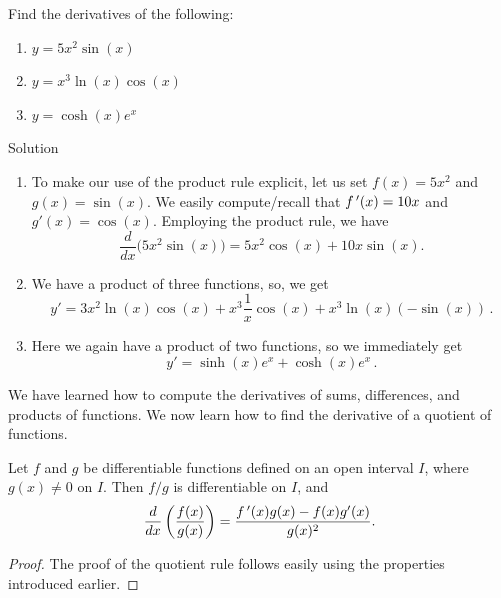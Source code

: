 \fi
\fi


\begin{example}\label{ex_prod1}
Find the derivatives of the following:
\begin{multicols}{3}
\begin{enumerate}
\item $y=5x^2\sin(x)$
\item $y = x^3\ln(x)\cos(x)$
\ifcourse
\ifanalysis \item $y=\cosh(x)e^x$\fi \fi
\end{enumerate}
\end{multicols}

Solution 

\begin{enumerate}
\item To make our use of the product rule explicit, let us set $f(x) = 5x^2$ and $g(x) = \sin (x)$. We easily compute/recall that $f\,'(x) = 10x$ and $g'(x) = \cos (x)$. Employing the product rule, we have 
$$\frac{d}{dx}\Big(5x^2\sin (x)\Big) = 5x^2\cos (x) + 10x\sin (x).$$
\item We have a product of three functions, so, we get
$$
y' = 3x^2\ln(x)\cos(x)  + x^3\frac{1}{x}\cos(x)+ x^3\ln(x)(-\sin(x))\,.
$$
\ifcourse
\ifanalysis \item Here we again have a product of two functions, so we immediately get
 $$y'=\sinh(x)e^x+\cosh(x)e^x\,.$$
 \fi \fi
\end{enumerate}
\end{example}

We have learned how to compute the derivatives of sums, differences, and products of functions. We now learn how to find the derivative of a quotient of functions.

\begin{theorem}\label{thm:QuotientRule}
Let $f$ and $g$ be differentiable functions defined on an open interval $I$, where $g(x) \neq 0$ on $I$. Then $f/g$ is differentiable on $I$, and 
$$\frac{d}{dx}\left(\frac{f(x)}{g(x)}\right) = \frac{f\,'(x)g(x) - f(x)g'(x)}{g(x)^2}.$$
\end{theorem}
\ifcourse
\ifanalysis 
\begin{proof}
The proof of the quotient rule follows easily using the properties introduced earlier. 
\end{proof}
\fi \fi

